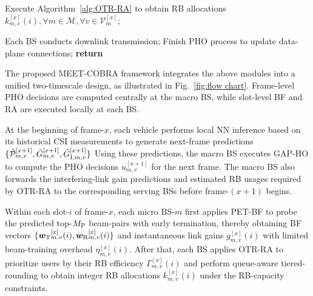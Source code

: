 \documentclass[10pt,journal,letterpaper]{journal_template/IEEEtran}
\newcommand{\rev}[1]{\textcolor{revisioncolor}{{}#1}}
\newif\ifshowdeletions
\newcommand{\currentdel}[1]{\ifshowdeletions\textcolor{deletioncolor}{\sout{#1}}\fi}
\theoremstyle{remark}
\begin{document}
\begin{algorithm}[htbp]
\begin{algorithmic}[1]
                    \STATE Execute Algorithm~\ref{alg:OTR-RA} to obtain RB allocations $k_{m,v}^{[x]}(i), \forall m \in \mathcal{M}, \forall v\in \mathcal{V}^{[x]}_m$;
                                
                    \STATE Each BS conducts downlink transmission;
                \ENDFOR
                \STATE Finish PHO process to update data-plane connections;
            \ENDFOR
            \STATE \textbf{return} 
        \end{algorithmic}
    \end{algorithm}
\fi

The proposed MEET-COBRA framework integrates the above modules into a unified two-timescale design, as illustrated in Fig.~\ref{fig:flow chart}.
Frame-level PHO decisions are computed centrally at the macro BS, while slot-level BF and RA are executed locally at each BS. 

At the beginning of frame-$x$, each vehicle performs local NN inference based on its historical CSI measurements to generate next-frame predictions $\{\Tilde{\mathcal{P}}_{m,v}^{[x+1]}, \Tilde{G}_{m,v}^{[x+1]}, \Tilde{G}_{{\rm I},m,v}^{[x+1]}\}$\currentdel{, which are reported to the macro BS through the control-plane uplink.} Using these predictions, the macro BS executes GAP-HO to compute the PHO decisions $u_{m,v}^{[x+1]}$ for the next frame. \rev{The macro BS also forwards the interfering-link gain predictions and estimated RB usages required by OTR-RA to the corresponding serving BSs before frame-$(x+1)$ begins.}

Within each slot-$i$ of frame-$x$, each micro BS-$m$ first applies PET-BF to probe the predicted top-$M_{\rm P}$ beam-pairs with early termination, thereby obtaining BF vectors $\{{\bm{w}_{\rm T}}_{m,v}^{[x]}(i), {\bm{w}_{\rm R}}_{m,v}^{[x]}(i)\}$ and instantaneous link gains $g_{m,v}^{[x]}(i)$ with limited beam-training overhead $\eta_{m,v}^{[x]}(i)$. 
After that, each BS applies OTR-RA to prioritize users by their RB efficiency $\Gamma_{m,v}^{[x]}(i)$ and perform queue-aware tiered-rounding to obtain integer RB allocations $k_{m,v}^{[x]}(i)$ under the RB-capacity constraints.
\end{document}
